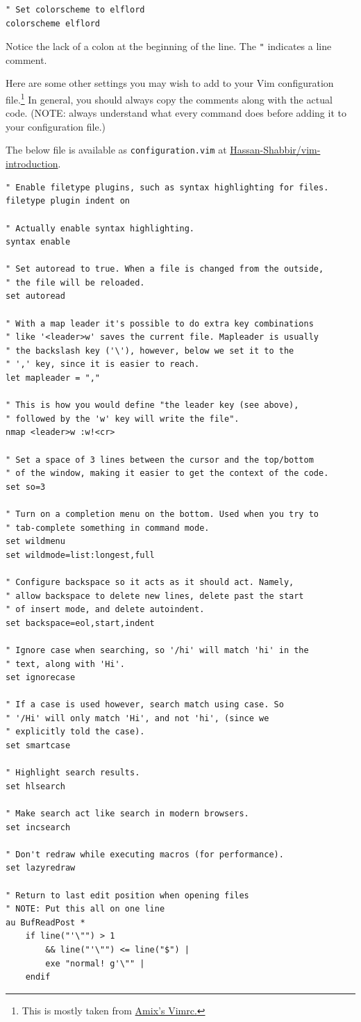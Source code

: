 \documentclass[11pt]{article}
\begin{document}
\begin{verbatim}
" Set colorscheme to elflord
colorscheme elflord
\end{verbatim}

Notice the lack of a colon at the beginning of the line. The \texttt{"} indicates a
line comment.

Here are some other settings you may wish to add to your Vim configuration
file.\footnote{This is mostly taken from \href{https://github.com/amix/vimrc}{Amix's Vimrc.}} In general, you should always copy the comments along with the
actual code. (NOTE: always understand what every command does before adding it
to your configuration file.)

The below file is available as \texttt{configuration.vim} at
\href{https://github.com/Hassan-Shabbir/vim-introduction}{Hassan-Shabbir/vim-introduction}.

\begin{verbatim}
" Enable filetype plugins, such as syntax highlighting for files.
filetype plugin indent on

" Actually enable syntax highlighting.
syntax enable 

" Set autoread to true. When a file is changed from the outside,
" the file will be reloaded.
set autoread

" With a map leader it's possible to do extra key combinations 
" like '<leader>w' saves the current file. Mapleader is usually 
" the backslash key ('\'), however, below we set it to the 
" ',' key, since it is easier to reach.
let mapleader = ","

" This is how you would define "the leader key (see above), 
" followed by the 'w' key will write the file".
nmap <leader>w :w!<cr>

" Set a space of 3 lines between the cursor and the top/bottom
" of the window, making it easier to get the context of the code.
set so=3

" Turn on a completion menu on the bottom. Used when you try to 
" tab-complete something in command mode.
set wildmenu
set wildmode=list:longest,full

" Configure backspace so it acts as it should act. Namely, 
" allow backspace to delete new lines, delete past the start 
" of insert mode, and delete autoindent.
set backspace=eol,start,indent

" Ignore case when searching, so '/hi' will match 'hi' in the
" text, along with 'Hi'.
set ignorecase

" If a case is used however, search match using case. So 
" '/Hi' will only match 'Hi', and not 'hi', (since we 
" explicitly told the case).
set smartcase

" Highlight search results.
set hlsearch

" Make search act like search in modern browsers.
set incsearch 

" Don't redraw while executing macros (for performance).
set lazyredraw 

" Return to last edit position when opening files
" NOTE: Put this all on one line
au BufReadPost * 
    if line("'\"") > 1 
        && line("'\"") <= line("$") | 
        exe "normal! g'\"" | 
    endif
\end{verbatim}
\end{document}
